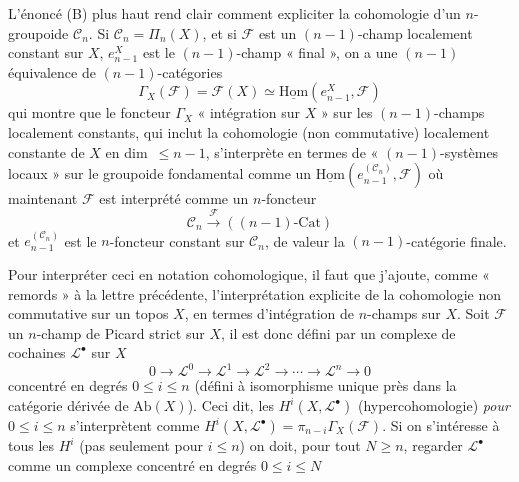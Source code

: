 \documentclass[11pt,a4paper]{article}
\begin{document}
L'énoncé (B) plus haut rend clair comment expliciter la cohomologie d'un $n$-groupoide $\mathcal{C}_n$. Si $\mathcal{C}_n = \Pi_n(X)$, et si $\mathcal{F}$ est un $(n-1)$-champ localement constant sur $X$, $e^X_{n-1}$ est le $(n-1)$-champ « final », on a une $(n-1)$ équivalence de $(n-1)$-catégories
\[
\Gamma_X(\mathcal{F}) = \mathcal{F}(X) \simeq \underline{\mathrm{Hom}}(e^X_{n-1}, \mathcal{F})
\]
qui montre que le foncteur $\Gamma_X$ « intégration sur $X$ » sur les $(n-1)$-champs localement constants, qui inclut la cohomologie (non commutative) localement constante de $X$ en dim~$\leqslant n-1$, s'interprète en termes de « $(n-1)$-systèmes locaux » sur le groupoide fondamental comme un $\underline{\mathrm{Hom}}(e^{(\mathcal{C}_n)}_{n-1}, \mathcal{F})$ où maintenant $\mathcal{F}$ est interprété comme un $n$-foncteur
\[
\mathcal{C}_n \xrightarrow{\ \mathcal{F}\ } ((n-1)\text{-}\mathrm{Cat})
\]
et $e^{(\mathcal{C}_n)}_{n-1}$ est le $n$-foncteur constant sur $\mathcal{C}_n$, de valeur la $(n-1)$-catégorie finale.

Pour interpréter ceci en notation cohomologique, il faut que j'ajoute, comme « remords » à la lettre précédente, l'interprétation explicite de la cohomologie non commutative sur un topos $X$, en termes d'intégration de $n$-champs sur $X$. Soit $\mathcal{F}$ un $n$-champ de Picard strict sur $X$, il est donc défini par un complexe de cochaines $\mathcal{L}^\bullet$ sur $X$
\[
0 \to \mathcal{L}^0 \to \mathcal{L}^1 \to \mathcal{L}^2 \to \cdots \to \mathcal{L}^n \to 0
\]
concentré en degrés $0 \leqslant i \leqslant n$ (défini à isomorphisme unique près dans la catégorie dérivée de $\mathrm{Ab}(X)$). Ceci dit, les $H^i(X, \mathcal{L}^\bullet)$ (hypercohomologie) \emph{pour $0 \leqslant i \leqslant n$} s'interprètent comme $H^i(X, \mathcal{L}^\bullet) = \pi_{n-i}\Gamma_X(\mathcal{F})$. Si on s'intéresse à tous les $H^i$ (pas seulement pour $i \leqslant n$) on doit, pour tout $N \geqslant n$, regarder $\mathcal{L}^\bullet$ comme un complexe concentré en degrés $0 \leqslant i \leqslant N$
\end{document}
